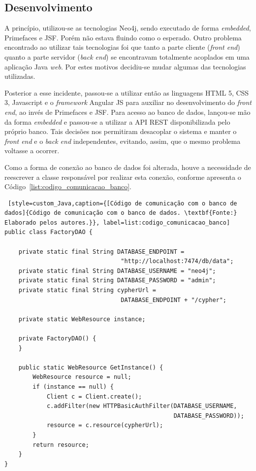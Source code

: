 \subsection{Desenvolvimento}

\par A princípio, utilizou-se as tecnologias Neo4j, sendo executado de forma \textit{embedded}, Primefaces e JSF. Porém não estava fluindo como o esperado. Outro problema encontrado ao utilizar tais tecnologias foi que tanto a parte cliente (\textit{front end}) quanto a parte servidor (\textit{back end}) se encontravam totalmente acoplados em uma aplicação Java \textit{web}. Por estes motivos decidiu-se mudar algumas das tecnologias utilizadas.

\par Posterior a esse incidente, passou-se a utilizar então as linguagens HTML 5, CSS 3, Javascript e o \textit{framework} Angular JS para auxiliar no desenvolvimento do \textit{front end}, ao invés de Primefaces e JSF. Para acesso ao banco de dados, lançou-se mão da forma \textit{embedded} e passou-se a utilizar a API REST disponibilizada pelo próprio banco. Tais decisões nos permitiram desacoplar o sistema e manter o \textit{front end} e o \textit{back end} independentes, evitando, assim, que o mesmo problema voltasse a ocorrer.

\par Como a forma de conexão ao banco de dados foi alterada, houve a necessidade de reescrever a classe responsável por realizar esta conexão, conforme apresenta o Código~\ref{list:codigo_comunicacao_banco}.

\begin{lstlisting} [style=custom_Java,caption={[Código de comunicação com o banco de dados]{Código de comunicação com o banco de dados. \textbf{Fonte:} Elaborado pelos autores.}}, label=list:codigo_comunicacao_banco]
public class FactoryDAO {

	private static final String DATABASE_ENDPOINT =
								 "http://localhost:7474/db/data";
	private static final String DATABASE_USERNAME = "neo4j";
	private static final String DATABASE_PASSWORD = "admin";
	private static final String cypherUrl = 
								 DATABASE_ENDPOINT + "/cypher";
	
	private static WebResource instance;
	
	private FactoryDAO() {
	}
	
	public static WebResource GetInstance() {
		WebResource resource = null;
		if (instance == null) {
			Client c = Client.create();
			c.addFilter(new HTTPBasicAuthFilter(DATABASE_USERNAME,
												DATABASE_PASSWORD));
			resource = c.resource(cypherUrl);
		}
		return resource;
	}
}
\end{lstlisting}

